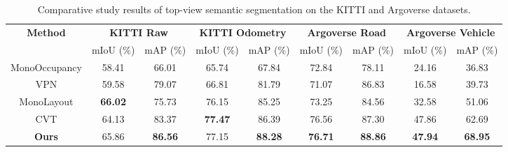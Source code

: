 \begin{table*}[!t]
\caption{Comparative study results of top-view semantic segmentation on the KITTI and Argoverse datasets.}
\label{tb:result_comparative}
\begin{center}
\begin{small}
\begin{tabular}{ccccccccc}
\toprule
\multicolumn{1}{c}{\multirow{2}[2]{*}{\textbf{Method}}} & \multicolumn{2}{c}{\textbf{KITTI Raw}} & \multicolumn{2}{c}{\textbf{KITTI Odometry}} & \multicolumn{2}{c}{\textbf{Argoverse Road}} & \multicolumn{2}{c}{\textbf{Argoverse Vehicle}} \\ 
\cmidrule(lr){2-5}
\cmidrule(lr){6-9}
 & mIoU (\%) & mAP (\%) & mIoU (\%) & mAP (\%) & mIoU (\%) & mAP (\%) & mIoU (\%) & mAP (\%) \\

\midrule

MonoOccupancy \cite{lu2019monocular} & 58.41 & 66.01 & 65.74 & 67.84 & 72.84 & 78.11 & 24.16 & 36.83\\
VPN \cite{pan2020cross} & 59.58 & 79.07 & 66.81 & 81.79 & 71.07 & 86.83 & 16.58 & 39.73 \\
MonoLayout \cite{mani2020monolayout} & \textbf{66.02} & 75.73 & 76.15 & 85.25 & 73.25 & 84.56 & 32.58 & 51.06\\
CVT \cite{yang2021projecting} & 64.13 & 83.37 & \textbf{77.47} & 86.39 & 76.56 & 87.30 & 47.86 & 62.69\\
\midrule

\textbf{Ours}& 65.86&  \textbf{86.56}&  77.15& \textbf{88.28} & \textbf{76.71}&  \textbf{88.86}& \textbf{47.94} & \textbf{68.95}\\

\bottomrule
\end{tabular}
\end{small}
\end{center}
\end{table*}
